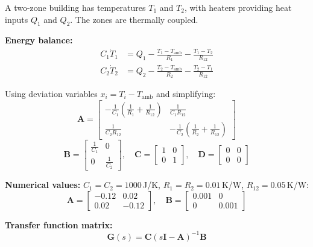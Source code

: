 \begin{example}
\label{ex:mimo_thermal}
A two-zone building has temperatures $T_1$ and $T_2$, with heaters providing heat inputs $Q_1$ and $Q_2$. The zones are thermally coupled.

\textbf{Energy balance:}
\begin{align}
C_1\dot{T}_1 &= Q_1 - \frac{T_1 - T_{\text{amb}}}{R_1} - \frac{T_1 - T_2}{R_{12}} \\
C_2\dot{T}_2 &= Q_2 - \frac{T_2 - T_{\text{amb}}}{R_2} - \frac{T_2 - T_1}{R_{12}}
\end{align}

Using deviation variables $x_i = T_i - T_{\text{amb}}$ and simplifying:
\begin{equation}
\mathbf{A} = \begin{bmatrix} -\frac{1}{C_1}\left(\frac{1}{R_1} + \frac{1}{R_{12}}\right) & \frac{1}{C_1 R_{12}} \\ \frac{1}{C_2 R_{12}} & -\frac{1}{C_2}\left(\frac{1}{R_2} + \frac{1}{R_{12}}\right) \end{bmatrix}
\end{equation}
\begin{equation}
\mathbf{B} = \begin{bmatrix} \frac{1}{C_1} & 0 \\ 0 & \frac{1}{C_2} \end{bmatrix}, \quad \mathbf{C} = \begin{bmatrix} 1 & 0 \\ 0 & 1 \end{bmatrix}, \quad \mathbf{D} = \begin{bmatrix} 0 & 0 \\ 0 & 0 \end{bmatrix}
\end{equation}

\textbf{Numerical values:} $C_1 = C_2 = 1000$\,J/K, $R_1 = R_2 = 0.01$\,K/W, $R_{12} = 0.05$\,K/W:
\begin{equation}
\mathbf{A} = \begin{bmatrix} -0.12 & 0.02 \\ 0.02 & -0.12 \end{bmatrix}, \quad \mathbf{B} = \begin{bmatrix} 0.001 & 0 \\ 0 & 0.001 \end{bmatrix}
\end{equation}

\textbf{Transfer function matrix:}
\begin{equation}
\mathbf{G}(s) = \mathbf{C}(s\mathbf{I} - \mathbf{A})^{-1}\mathbf{B}
\end{equation}


\end{example}
